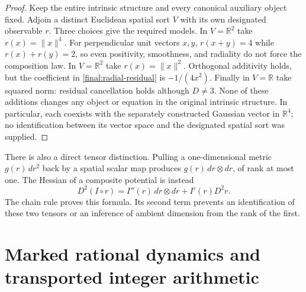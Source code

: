 \begin{proof}
Keep the entire intrinsic structure and every canonical auxiliary
object fixed.  Adjoin a distinct Euclidean spatial sort $V$ with its
own designated observable $r$.  Three choices give the required
models.  In $V=\mathbb R^2$ take $r(x)=\|x\|^4$.  For perpendicular
unit vectors $x,y$, $r(x+y)=4$ while $r(x)+r(y)=2$, so even positivity,
smoothness, and radiality do not force the composition law.  In
$V=\mathbb R^2$ take $r(x)=\|x\|^2$.  Orthogonal additivity holds,
but the coefficient in \eqref{final:radial-residual} is $-1/(4x^2)$.
Finally in $V=\mathbb R$ take squared norm: residual cancellation
holds although $D\ne3$.  None of these additions changes any object
or equation in the original intrinsic structure.  In particular,
each coexists with the separately constructed Gaussian vector in
$\mathbb R^4$; no identification between its vector space and the
designated spatial sort was supplied.
\end{proof}

There is also a direct tensor distinction.  Pulling a one-dimensional
metric $g(r)\,dr^2$ back by a spatial scalar map produces
$g(r)\,dr\otimes dr$, of rank at most one.  The Hessian of a composite
potential is instead
\[
 D^2(I\circ r)=I''(r)\,dr\otimes dr+I'(r)D^2r.
\]
The chain rule proves this formula.  Its second term prevents an
identification of these two tensors or an inference of ambient
dimension from the rank of the first.

\section{Marked rational dynamics and transported integer arithmetic}
\label{final:arithmetic}

